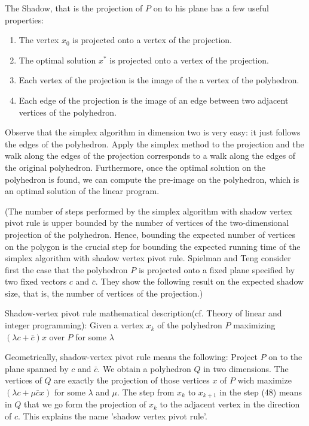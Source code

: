 \documentclass{article}
\begin{document}
The Shadow, that is the projection of $P$ on to his plane has a few useful properties:
\begin{enumerate}
    \item The vertex $x_0$ is projected onto a vertex of the projection.
    \item The optimal solution $x^*$ is projected onto a vertex of the projection.
    \item Each vertex of the projection is the image of the a vertex of the polyhedron.
    \item Each edge of the projection is the image of an edge between two adjacent vertices of the polyhedron.
\end{enumerate}

Observe that the simplex algorithm in dimension two is very easy: it just follows the edges of the polyhedron. Apply the simplex method to the projection and the walk along the edges of the projection corresponds to a walk along the edges of the original polyhedron. Furthermore, once the optimal solution on the polyhedron is found, we can compute the pre-image on the polyhedron, which is an optimal solution of the linear program.

(The number of steps performed by the simplex algorithm with shadow vertex pivot rule is upper bounded by the number of vertices of the two-dimensional projection of the polyhedron. Hence, bounding the expected number of vertices on the polygon is the crucial step for
bounding the expected running time of the simplex algorithm with shadow vertex pivot rule. Spielman and Teng consider first the case that the polyhedron $P$ is projected onto a fixed plane specified by two fixed vectors $c$ and $\bar{c}$. They show the following result on the expected
shadow size, that is, the number of vertices of the projection.)

Shadow-vertex pivot rule mathematical description(cf. Theory of linear and integer programming): Given a vertex $x_k$ of the polyhedron $P$ maximizing $(\lambda c+\bar{c})x$ over $P$ for some $\lambda$

Geometrically, shadow-vertex pivot rule means the following: Project $P$ on to the plane spanned by $c$ and $\bar{c}$. We obtain a polyhedron $Q$ in two dimensions. The vertices of $Q$ are exactly the projection of those vertices $x$ of $P$ wich maximize $(\lambda c+\mu \bar{c}x)$ for some $\lambda$ and $\mu$. The step from $x_k$ to $x_{k+1}$ in the step (48) means in $Q$ that we go form the projection of $x_k$ to the adjacent vertex in the direction of $c$. This explains the name 'shadow vertex pivot rule'.
\end{document}
